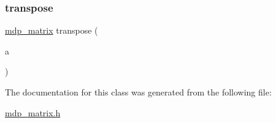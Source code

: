\mbox{\label{classmdp__matrix_a271d6793f4231f7b290179bff594e8d1}} 
\subsubsection{\texorpdfstring{transpose}{transpose}}
{\footnotesize\ttfamily \hyperlink{classmdp__matrix}{mdp\+\_\+matrix} transpose (\begin{DoxyParamCaption}\item[{const \hyperlink{classmdp__matrix}{mdp\+\_\+matrix} \&}]{a }\end{DoxyParamCaption})\hspace{0.3cm}{\ttfamily [friend]}}



The documentation for this class was generated from the following file\+:\begin{DoxyCompactItemize}
\item 
\hyperlink{mdp__matrix_8h}{mdp\+\_\+matrix.\+h}\end{DoxyCompactItemize}
